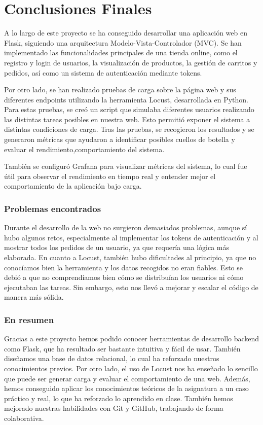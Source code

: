\documentclass[10pt]{book}
\begin{document}
\section{Conclusiones Finales}

A lo largo de este proyecto se ha conseguido desarrollar una aplicación web en Flask, siguiendo una arquitectura Modelo-Vista-Controlador (MVC). Se han implementado las funcionalidades principales de una tienda online, como el registro y login de usuarios, la visualización de productos, la gestión de carritos y pedidos, así como un sistema de autenticación mediante tokens.

Por otro lado, se han realizado pruebas de carga sobre la página web y sus diferentes endpoints utilizando la herramienta Locust, desarrollada en Python. Para estas pruebas, se creó un script que simulaba diferentes usuarios realizando las distintas tareas posibles en nuestra web. Esto permitió exponer el sistema a distintas condiciones de carga. Tras las pruebas, se recogieron los resultados y se generaron métricas que ayudaron a identificar posibles cuellos de botella y evaluar el rendimiento,comportamiento del sistema.

También se configuró Grafana para visualizar métricas del sistema, lo cual fue útil para observar el rendimiento en tiempo real y entender mejor el comportamiento de la aplicación bajo carga.

\subsubsection*{Problemas encontrados}
Durante el desarrollo de la web no surgieron demasiados problemas, aunque sí hubo algunos retos, especialmente al implementar los tokens de autenticación y al mostrar todos los pedidos de un usuario, ya que requería una lógica más elaborada. En cuanto a Locust, también hubo dificultades al principio, ya que no conocíamos bien la herramienta y los datos recogidos no eran fiables. Esto se debió a que no comprendíamos bien cómo se distribuían los usuarios ni cómo ejecutaban las tareas. Sin embargo, esto nos llevó a mejorar y escalar el código de manera más sólida.

\subsubsection*{En resumen}
Gracias a este proyecto hemos podido conocer herramientas de desarrollo backend como Flask, que ha resultado ser bastante intuitiva y fácil de usar. También diseñamos una base de datos relacional, lo cual ha reforzado nuestros conocimientos previos. Por otro lado, el uso de Locust nos ha enseñado lo sencillo que puede ser generar carga y evaluar el comportamiento de una web. Además, hemos conseguido aplicar los conocimientos teóricos de la asignatura a un caso práctico y real, lo que ha reforzado lo aprendido en clase. También hemos mejorado nuestras habilidades con Git y GitHub, trabajando de forma colaborativa.
\end{document}
